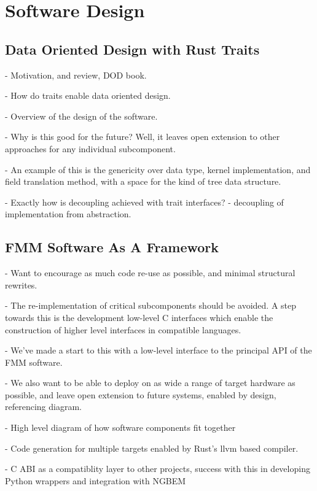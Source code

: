 \chapter{Software Design}\label{chpt:software_design}
\thispagestyle{chaptertitle} %


\section{Data Oriented Design with Rust Traits}

- Motivation, and review, DOD book.

- How do traits enable data oriented design.

- Overview of the design of the software.

- Why is this good for the future? Well, it leaves open extension to other approaches for any individual subcomponent.

- An example of this is the genericity over data type, kernel implementation, and field translation method, with a space for the kind of tree data structure.

- Exactly how is decoupling achieved with trait interfaces?
    - decoupling of implementation from abstraction.

\section{FMM Software As A Framework}

- Want to encourage as much code re-use as possible, and minimal structural rewrites.

- The re-implementation of critical subcomponents should be avoided. A step towards this is the development low-level C interfaces which enable the construction of higher level interfaces in compatible languages.

- We've made a start to this with a low-level interface to the principal API of the FMM software.

- We also want to be able to deploy on as wide a range of target hardware as possible, and leave open extension to future systems, enabled by design, referencing diagram.

- High level diagram of how software components fit together

- Code generation for multiple targets enabled by Rust's llvm based compiler.

- C ABI as a compatiblity layer to other projects, success with this in developing Python wrappers and integration with NGBEM

